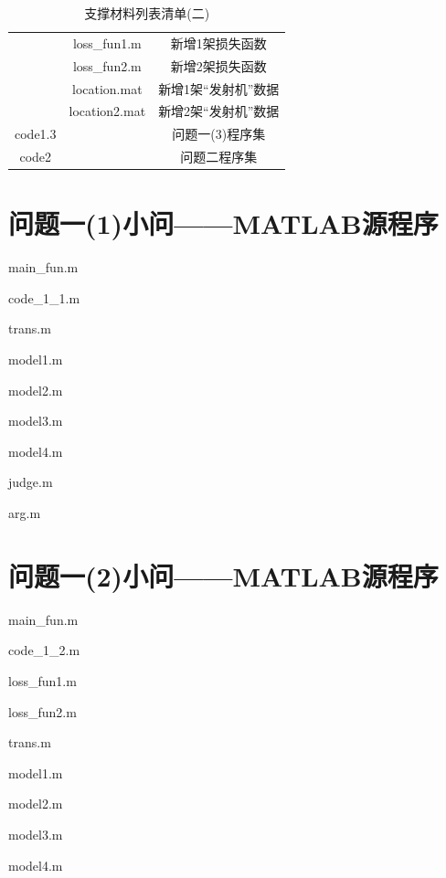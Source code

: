 \documentclass[withoutpreface,bwprint]{cumcmthesis} %
\begin{document}
\begin{appendices}
\begin{table}[htbp]
\begin{tabular}{ccc}
				\bottomrule
			\end{tabular}%
			\label{tab:addlabel}%
		\end{table}%
			\begin{table}[htbp]
				\renewcommand\arraystretch{0.1}
				\tabcolsep=0.2cm
				\centering
				\caption{支撑材料列表清单(二)}
				\begin{tabular}{ccc}
					\toprule[1.5pt]
					\makebox[0.27\textwidth][c]{文件夹名}	& \makebox[0.3\textwidth][c]{文件夹内容}	& \makebox[0.4\textwidth][c]{文件描述} \\ 
					\midrule
						&loss\_fun1.m  & 新增1架损失函数\\
					&loss\_fun2.m  & 新增2架损失函数\\
					&location.mat  & 新增1架“发射机”数据 \\
					&location2.mat  & 新增2架“发射机”数据 \\
					code1.3	& & 问题一(3)程序集 \\
					code2	& & 问题二程序集 \\
					\bottomrule
				\end{tabular}%
				\label{tab:addlabel}%
			\end{table}%
	

		\section{问题一(1)小问——MATLAB源程序}
		main\_fun.m
		
		code\_1\_1.m
			
		trans.m
		
		model1.m
		
		model2.m
		
		model3.m
		
		model4.m
		
		judge.m
		
		arg.m
		
		\section{问题一(2)小问——MATLAB源程序}
		main\_fun.m
			
		code\_1\_2.m
			
		loss\_fun1.m
			
		loss\_fun2.m
			
		trans.m
			
		model1.m
			
		model2.m
			
		model3.m
			
		model4.m
			

\end{appendices}
\end{document}
